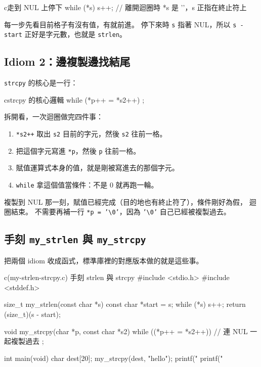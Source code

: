 \begin{code}{c}{走到 NUL 上停下}
while (*s) {
    s++;
}
// 離開迴圈時 *s 是 '\0'，s 正指在終止符上
\end{code}

每一步先看目前格子有沒有值，有就前進。 停下來時 \texttt{s} 指著
NUL，所以 \texttt{s - start} 正好是字元數，也就是 \texttt{strlen}。

\subsection{Idiom 2：邊複製邊找結尾}

\texttt{strcpy} 的核心是一行：

\begin{code}{c}{strcpy 的核心邏輯}
while (*p++ = *s2++) {
    ;
}
\end{code}

拆開看，一次迴圈做完四件事：

\begin{enumerate}
\item \texttt{*s2++} 取出 \texttt{s2} 目前的字元，然後 \texttt{s2}
      往前一格。
\item 把這個字元寫進 \texttt{*p}，然後 \texttt{p} 往前一格。
\item 賦值運算式本身的值，就是剛被寫進去的那個字元。
\item \texttt{while} 拿這個值當條件：不是 $0$ 就再跑一輪。
\end{enumerate}

複製到 NUL 那一刻，賦值已經完成（目的地也有終止符了），條件剛好為假，
迴圈結束。 不需要再補一行 \texttt{*p = '\textbackslash 0'}，因為
\texttt{'\textbackslash 0'} 自己已經被複製過去。

\subsection{手刻 \texttt{my\_strlen} 與 \texttt{my\_strcpy}}

把兩個 idiom 收成函式，標準庫裡的對應版本做的就是這些事。

\begin{example}{c}{(my-strlen-strcpy.c) 手刻 strlen 與 strcpy}
#include <stdio.h>
#include <stddef.h>

size_t my_strlen(const char *s) {
    const char *start = s;
    while (*s) {
        s++;
    }
    return (size_t)(s - start);
}

void my_strcpy(char *p, const char *s2) {
    while ((*p++ = *s2++)) {   // 連 NUL 一起複製過去
        ;
    }
}

int main(void) {
    char dest[20];
    my_strcpy(dest, "hello");
    printf("%
    printf("%
}
\end{example}

